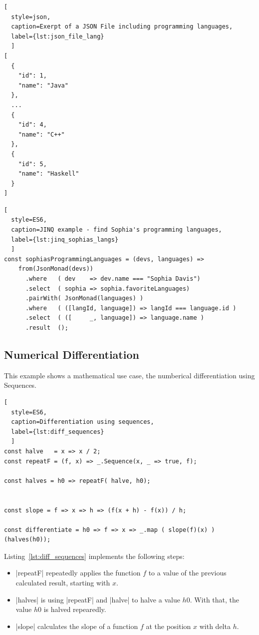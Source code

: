 \begin{lstlisting}[
  style=json, 
  caption=Exerpt of a JSON File including programming languages,
  label={lst:json_file_lang}
  ]
[
  {
    "id": 1,
    "name": "Java"
  },
  ...
  {
    "id": 4,
    "name": "C++"
  },
  {
    "id": 5,
    "name": "Haskell"
  }
]
\end{lstlisting}

\begin{lstlisting}[
  style=ES6, 
  caption=JINQ example - find Sophia's programming languages,
  label={lst:jinq_sophias_langs}
  ]
const sophiasProgrammingLanguages = (devs, languages) =>
    from(JsonMonad(devs))
      .where   ( dev    => dev.name === "Sophia Davis")
      .select  ( sophia => sophia.favoriteLanguages)
      .pairWith( JsonMonad(languages) )
      .where   ( ([langId, language]) => langId === language.id )
      .select  ( ([     _, language]) => language.name )
      .result  ();
\end{lstlisting}

\subsection{Numerical Differentiation}
\label{sub:Numerical Differentiation}
This example shows a mathematical use case, the numberical differentiation using Sequences.

\begin{lstlisting}[
  style=ES6, 
  caption=Differentiation using sequences,
  label={lst:diff_sequences}
  ]
const halve   = x => x / 2;
const repeatF = (f, x) => _.Sequence(x, _ => true, f);

const halves = h0 => repeatF( halve, h0);


const slope = f => x => h => (f(x + h) - f(x)) / h;

const differentiate = h0 => f => x => _.map ( slope(f)(x) ) (halves(h0));
\end{lstlisting}

Listing~\ref{lst:diff_sequences} implements the following steps: 


\begin{itemize}
  \item{|repeatF| repeatedly applies the function $f$ to a value of the
    previous calculated result, starting with $x$.}
  \item{ |halves| is using |repeatF| and |halve| to halve a value $h0$. With
      that, the value $h0$ is halved repearedly.} 
    \item{|slope| calculates the slope of a function $f$ at the position $x$
      with delta $h$.}
 \end{itemize}

